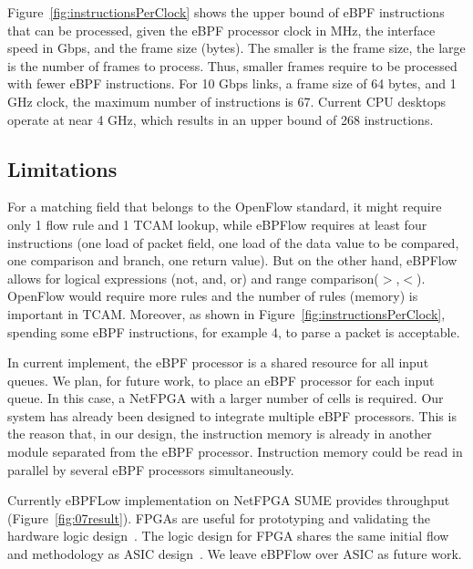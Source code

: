 Figure~\ref{fig:instructionsPerClock} shows the upper bound of eBPF instructions that can be processed, given the eBPF processor clock in MHz, the interface speed in Gbps, and the frame size (bytes). The smaller is the frame size, the large is the number of frames to process. Thus, smaller frames require to be processed with fewer eBPF instructions. For 10 Gbps links, a frame size of 64 bytes, and 1 GHz clock, the maximum number of instructions is 67.
Current CPU desktops operate at near 4 GHz, which results in an upper bound of 268 instructions.


\subsection{Limitations}

%

For a matching field that belongs to the OpenFlow standard, it might require only 1 flow rule and 1 TCAM lookup, while eBPFlow requires at least four instructions (one load of packet field, one load of the data value to be compared, one comparison and branch, one return value). But on the other hand, eBPFlow allows for logical expressions (not, and, or) and range comparison($>$,$<$). OpenFlow would require more rules and the number of rules (memory) is important in TCAM. Moreover, as shown in Figure~\ref{fig:instructionsPerClock}, spending some eBPF instructions, for example 4, to parse a packet is acceptable.

In current implement, the eBPF processor is a shared resource for all input queues.
We plan, for future work, to place an eBPF processor for each input queue. 
In this case, a NetFPGA with a larger number of cells is required.
Our system has already been designed to integrate multiple eBPF processors. This is the reason that, in our design, the instruction memory is already in another module separated from the eBPF processor. 
Instruction memory could be read in parallel by several eBPF processors simultaneously.

Currently eBPFLow implementation on NetFPGA SUME provides  throughput (Figure~\ref{fig:07result}). 
FPGAs are useful for prototyping and validating the hardware logic design~\cite{cofer2005rapid,sukhwani2017contutto}. 
The logic design for FPGA shares the same initial flow and methodology as ASIC design~\cite{kuon07measuring,ASICDesignFlow2005}. 
We leave eBPFlow over ASIC as future work.

